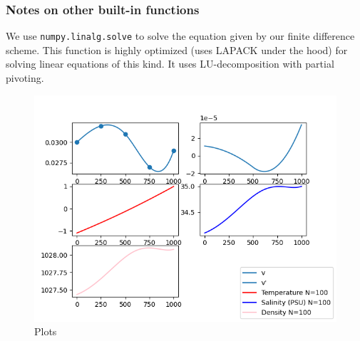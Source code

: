 \documentclass{article}
\begin{document}
\subsubsection*{Notes on other built-in functions}

We use \texttt{numpy.linalg.solve} to solve the equation given by our finite difference scheme. This function is highly optimized (uses LAPACK under the hood) for solving linear equations of this kind. It uses LU-decomposition with partial pivoting.

\begin{figure}[t]
    \includegraphics{Plots.png}
    \caption{Plots}
\end{figure}
\end{document}
